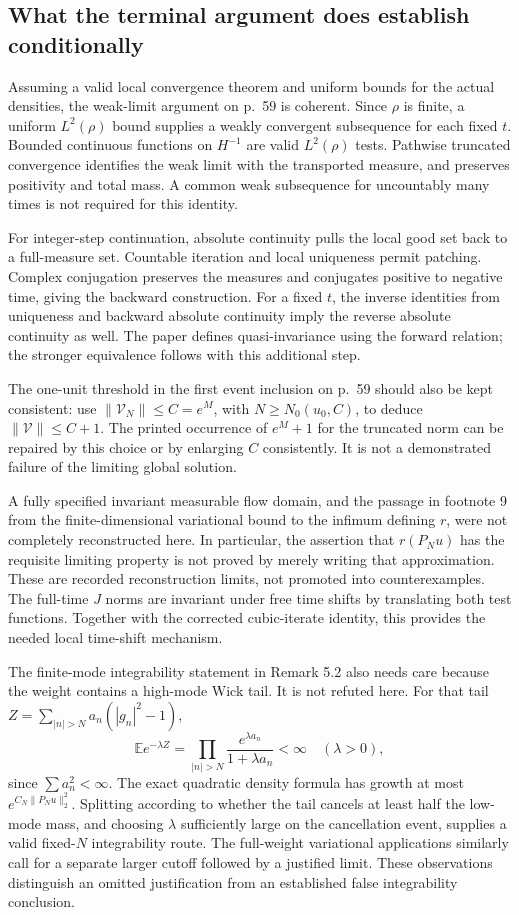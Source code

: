 \documentclass[10pt]{article}
\begin{document}
\subsection*{What the terminal argument does establish conditionally}
Assuming a valid local convergence theorem and uniform bounds for the actual densities, the weak-limit argument on p. 59 is coherent. Since \(\rho\) is finite, a uniform \(L^2(\rho)\) bound supplies a weakly convergent subsequence for each fixed \(t\). Bounded continuous functions on \(H^{-1}\) are valid \(L^2(\rho)\) tests. Pathwise truncated convergence identifies the weak limit with the transported measure, and preserves positivity and total mass. A common weak subsequence for uncountably many times is not required for this identity.\par
For integer-step continuation, absolute continuity pulls the local good set back to a full-measure set. Countable iteration and local uniqueness permit patching. Complex conjugation preserves the measures and conjugates positive to negative time, giving the backward construction. For a fixed \(t\), the inverse identities from uniqueness and backward absolute continuity imply the reverse absolute continuity as well. The paper defines quasi-invariance using the forward relation; the stronger equivalence follows with this additional step.\par
The one-unit threshold in the first event inclusion on p. 59 should also be kept consistent: use \(\|\mathcal V_N\|\le C=e^M\), with \(N\ge N_0(u_0,C)\), to deduce \(\|\mathcal V\|\le C+1\). The printed occurrence of \(e^M+1\) for the truncated norm can be repaired by this choice or by enlarging \(C\) consistently. It is not a demonstrated failure of the limiting global solution.\par
A fully specified invariant measurable flow domain, and the passage in footnote 9 from the finite-dimensional variational bound to the infimum defining \(r\), were not completely reconstructed here. In particular, the assertion that \(r(P_Nu)\) has the requisite limiting property is not proved by merely writing that approximation. These are recorded reconstruction limits, not promoted into counterexamples. The full-time \(J\) norms are invariant under free time shifts by translating both test functions. Together with the corrected cubic-iterate identity, this provides the needed local time-shift mechanism.\par
The finite-mode integrability statement in Remark 5.2 also needs care because the weight contains a high-mode Wick tail. It is not refuted here. For that tail \(Z=\sum_{|n|>N}a_n(|g_n|^2-1)\), \[\mathbb Ee^{-\lambda Z}
 =\prod_{|n|>N}\frac{e^{\lambda a_n}}{1+\lambda a_n}<\infty
 \quad(\lambda>0),\] since \(\sum a_n^2<\infty\). The exact quadratic density formula has growth at most \(e^{C_N\|P_Nu\|_2^2}\). Splitting according to whether the tail cancels at least half the low-mode mass, and choosing \(\lambda\) sufficiently large on the cancellation event, supplies a valid fixed-\(N\) integrability route. The full-weight variational applications similarly call for a separate larger cutoff followed by a justified limit. These observations distinguish an omitted justification from an established false integrability conclusion.\par
\end{document}
